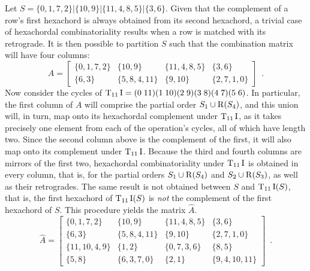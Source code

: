 \begin{example}
	\label{ex:starr-algorithm-2}
    \cite[224]{Starr1984}
    Let $S = \{ 0, 1, 7, 2 \} | \{ 10, 9 \} | \{ 11, 4, 8, 5 \} | \{ 3, 6 \}$. Given that the complement of a row's first hexachord is always obtained from its second hexachord, a trivial case of hexachordal combinatoriality results when a row is matched with its retrograde. It is then possible to partition $S$ such that the combination matrix will have four columns:
    \begin{equation}
        A = \left[
        \begin{array}{c|c|c|c}
        	\{ 0, 1, 7, 2 \} & \{ 10, 9 \} & \{ 11, 4, 8, 5 \} & \{ 3, 6 \} \\
        	\{ 6, 3 \} & \{ 5, 8, 4, 11 \} & \{ 9, 10 \} & \{ 2, 7, 1, 0 \}
        \end{array}
        \right] \enspace.
    \end{equation}
    Now consider the cycles of $\operatorname{T}_{11}\operatorname{I} = (0 \; 11) (1 \; 10) (2 \; 9) (3 \; 8) (4 \; 7) (5 \; 6)$. In particular, the first column of $A$ will comprise the partial order $S_1 \cup \operatorname{R}(S_4)$, and this union will, in turn, map onto its hexachordal complement under $\operatorname{T}_{11}\operatorname{I}$, as it takes precisely one element from each of the operation's cycles, all of which have length two. Since the second column above is the complement of the first, it will also map onto its complement under $\operatorname{T}_{11}\operatorname{I}$. Because the third and fourth columns are mirrors of the first two, hexachordal combinatoriality under $\operatorname{T}_{11}\operatorname{I}$ is obtained in every column, that is, for the partial orders $S_1 \cup \operatorname{R}(S_4)$ and $S_2 \cup \operatorname{R}(S_3)$, as well as their retrogrades. The same result is not obtained between $S$ and $\operatorname{T}_{11}\operatorname{I}(S)$, that is, the first hexachord of $\operatorname{T}_{11}\operatorname{I}(S)$ is \emph{not} the complement of the first hexachord of $S$. This procedure yields the matrix $\hat{A}$.
    \begin{equation}
        \hat{A} = \left[
        \begin{array}{c|c|c|c}
        	\{ 0, 1, 7, 2 \} & \{ 10, 9 \} & \{ 11, 4, 8, 5 \} & \{ 3, 6 \} \\
        	\{ 6, 3 \} & \{ 5, 8, 4, 11 \} & \{ 9, 10 \} & \{ 2, 7, 1, 0 \} \\
        	\{ 11, 10, 4, 9 \} & \{ 1, 2 \} & \{ 0, 7, 3, 6 \} & \{ 8, 5 \} \\
        	\{ 5, 8 \} & \{ 6, 3, 7, 0 \} & \{ 2, 1 \} & \{ 9, 4, 10, 11 \}
        \end{array}
        \right] \enspace.
    \end{equation}

\end{example}
